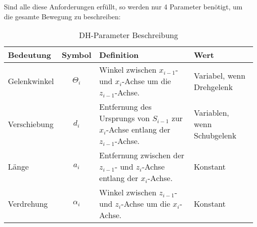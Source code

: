 			Sind alle diese Anforderungen erfüllt, so werden nur 4 Parameter benötigt, um die gesamte Bewegung zu beschreiben:

			\begin{table}[H]
				\centering
				\begin{tabular}{l | c | p{7cm} | l}
					Bedeutung    & Symbol           & Definition                                                                                                & Wert                        \\ \hline
					Gelenkwinkel & \( \Theta _ i \) & Winkel zwischen \( x _ { i - 1} \)- und \( x _ i \)-Achse um die \( z _ { i - 1 } \)-Achse.               & Variabel, wenn Drehgelenk   \\
					Verschiebung & \( d _ i \)      & Entfernung des Ursprungs von \( S _ {i - 1} \) zur \( x_i \)-Achse entlang der \( z _ { i - 1 } \)-Achse. & Variablen, wenn Schubgelenk \\
					Länge        & \( a _ i \)      & Entfernung zwischen der \( z _ { i - 1 } \)- und \( z _ i \)-Achse entlang der \( x _ i \)-Achse.         & Konstant                    \\
					Verdrehung   & \( \alpha _ i \) & Winkel zwischen \( z _ { i - 1 } \)- und \( z _ i \)-Achse um die \( x _ i \)-Achse.                      & Konstant
				\end{tabular}
				\caption{DH-Parameter Beschreibung}
			\end{table}


